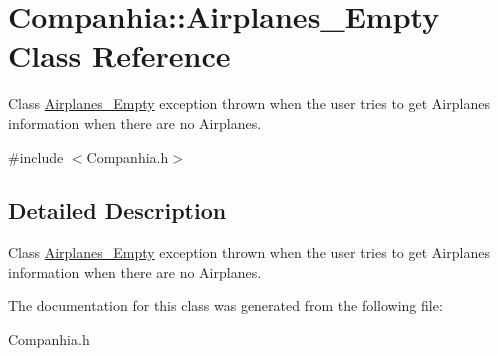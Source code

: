 \hypertarget{class_companhia_1_1_airplanes___empty}{}\section{Companhia\+:\+:Airplanes\+\_\+\+Empty Class Reference}
\label{class_companhia_1_1_airplanes___empty}


Class \hyperlink{class_companhia_1_1_airplanes___empty}{Airplanes\+\_\+\+Empty} exception thrown when the user tries to get Airplanes information when there are no Airplanes.  




{\ttfamily \#include $<$Companhia.\+h$>$}



\subsection{Detailed Description}
Class \hyperlink{class_companhia_1_1_airplanes___empty}{Airplanes\+\_\+\+Empty} exception thrown when the user tries to get Airplanes information when there are no Airplanes. 

The documentation for this class was generated from the following file\+:\begin{DoxyCompactItemize}
\item 
Companhia.\+h\end{DoxyCompactItemize}

